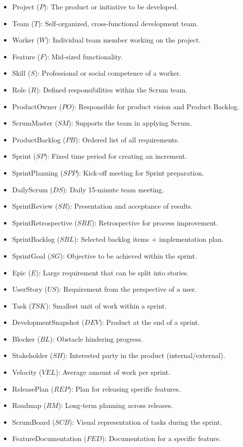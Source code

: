 \documentclass[11pt, a4paper]{article}
\begin{document}
\begin{itemize}
    \item Project ($P$): The product or initiative to be developed.
    \item Team ($T$): Self-organized, cross-functional development team.
    \item Worker ($W$): Individual team member working on the project.
    \item Feature ($F$): Mid-sized functionality.
    \item Skill ($S$): Professional or social competence of a worker.
    \item Role ($R$): Defined responsibilities within the Scrum team.
    \item ProductOwner ($PO$): Responsible for product vision and Product Backlog.
    \item ScrumMaster ($SM$): Supports the team in applying Scrum.
    \item ProductBacklog ($PB$): Ordered list of all requirements.
    \item Sprint ($SP$): Fixed time period for creating an increment.
    \item SprintPlanning ($SPP$): Kick-off meeting for Sprint preparation.
    \item DailyScrum ($DS$): Daily 15-minute team meeting.
    \item SprintReview ($SR$): Presentation and acceptance of results.
    \item SprintRetrospective ($SRE$): Retrospective for process improvement.
    \item SprintBacklog ($SBL$): Selected backlog items + implementation plan.
    \item SprintGoal ($SG$): Objective to be achieved within the sprint.
    \item Epic ($E$): Large requirement that can be split into stories.
    \item UserStory ($US$): Requirement from the perspective of a user.
    \item Task ($TSK$): Smallest unit of work within a sprint.
    \item DevelopmentSnapshot ($DEV$): Product at the end of a sprint.
    \item Blocker ($BL$): Obstacle hindering progress.
    \item Stakeholder ($SH$): Interested party in the product (internal/external).
    \item Velocity ($VEL$): Average amount of work per sprint.
    \item ReleasePlan ($REP$): Plan for releasing specific features.
    \item Roadmap ($RM$): Long-term planning across releases.
    \item ScrumBoard ($SCB$): Visual representation of tasks during the sprint.
    \item FeatureDocumentation ($FED$): Documentation for a specific feature.
\end{itemize}
\end{document}
